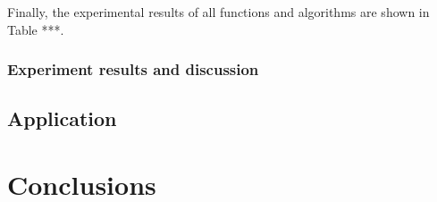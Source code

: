 \documentclass[a4paper,13pt,2p]{report}
\begin{document}
	Finally, the experimental results of all functions and algorithms are shown in Table ***.
	
\subsection{Experiment results and discussion}
\label{exp_results}

\section{Application}
\label{sec:exp_app}

\chapter{Conclusions}

\appendix



%
%
\end{document}
